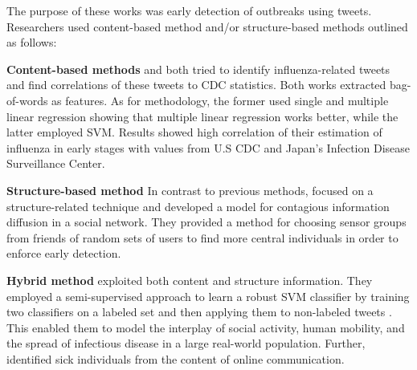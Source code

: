\documentclass[11pt,a4paper]{article}
\begin{document}
The purpose of these works was early detection of outbreaks using tweets. Researchers used content-based method and/or structure-based methods outlined as follows:

\textbf{Content-based methods} \citet{culotta} and \citet{aramaki} both tried to identify influenza-related tweets and find correlations of these tweets to CDC statistics.  Both works extracted bag-of-words as features. As for methodology, the former used single and multiple linear regression showing that multiple linear regression works better, while the latter employed SVM. Results showed high correlation of their estimation of influenza in early stages with values from U.S CDC and Japan's Infection Disease Surveillance Center.

\textbf{Structure-based method} In contrast to previous methods, \citet{garcia} focused on a structure-related technique and developed a model for contagious information diffusion in a social network. They provided a method for choosing sensor groups from friends of random sets of users to find more central individuals in order to enforce early detection.

\textbf{Hybrid method} \citet{sadilek} exploited both content and structure information. They employed a semi-supervised approach to learn a robust SVM classifier by training two classifiers on a labeled set and then applying them to non-labeled tweets . This enabled them to model the interplay of social activity, human mobility, and the spread of infectious disease in a large real-world population. Further, \citeauthor{sadelik} identified sick individuals from the content of online communication. %

\end{document}
